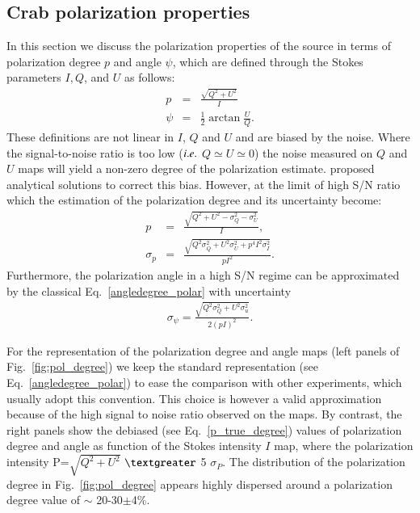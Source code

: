 \documentclass[twocolumn,traditabstract]{aa}
\begin{document}
\subsection{Crab polarization properties}\label{sec:pol_properties}
In this section we discuss the polarization properties of the source in terms of polarization degree $p$ and angle $\psi$, which are defined through the Stokes parameters $I, Q$, and $U$ as follows:
\begin{eqnarray}
 p    &=& \frac{\sqrt{Q^2 + U^2}}{I} \nonumber \\
 \psi &=& \frac{1}{2}\arctan\frac{U}{Q}.\label{angledegree_polar}
 \end{eqnarray}
 These definitions are not linear in $I$, $Q$ and $U$ and are biased by the noise. Where the signal-to-noise ratio is too low ($\it{i.e.}$ $ Q \simeq U \simeq 0$)  the noise measured on $Q$ and $U$ maps will yield a non-zero degree of the polarization estimate.
\citet{1980A&A....91...97S,1985A&A...142..100S,montier} proposed analytical solutions to correct this bias. However, at the limit of high S/N ratio which the estimation of the polarization degree and its uncertainty become:
 \begin{eqnarray}
 p    &=& \frac{\sqrt{Q^2 + U^2 - \sigma_{Q}^2 - \sigma_{U}^2}}{I}, \nonumber \\ 
  \sigma_{p} &=& \frac{\sqrt{Q^2\sigma_Q^2 + U^2\sigma_U^2 + p^4I^2\sigma_I^2}}{pI^2}.
  \label{p_true_degree}
 \end{eqnarray}
 Furthermore, the polarization angle in a high S/N regime can be approximated by the classical Eq.~\ref{angledegree_polar} with uncertainty
  \begin{eqnarray}\label{angle_uncertainty}
  \sigma_{\psi} = \frac{\sqrt{Q^2\sigma_Q^2 + U^2\sigma_u^2}}{2(pI)^2}.
  \end{eqnarray}
  
For the representation of the polarization degree and angle maps (left panels of Fig.~\ref{fig:pol_degree}) we keep the standard representation (see Eq.~\ref{angledegree_polar}) to ease the comparison with other experiments, which usually adopt this convention. This choice is however a valid approximation because of the high signal to noise ratio observed on the maps. By contrast, the right panels show the debiased (see Eq.~\ref{p_true_degree}) values of polarization degree and angle as function of the Stokes intensity $I$ map, where the polarization intensity P=$\sqrt{Q^2+U^2}$  $\textgreater$ 5 $\sigma_P$. 
The distribution of the polarization degree in Fig.~\ref{fig:pol_degree} appears highly dispersed around a polarization degree value of $\sim$ 20-30$\pm$4\%.
\end{document}
